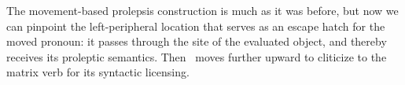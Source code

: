 \documentclass[output=paper,colorlinks,citecolor=brown]{langscibook}
\begin{document}
\ea%
    \label{ex:newkirk:39}
\z

The movement-based prolepsis construction is much as it was before, but now we can pinpoint the left-peripheral location that serves as an escape hatch for the moved pronoun: it passes through the site of the evaluated object, and thereby receives its proleptic semantics. Then \agre\ moves further upward to cliticize to the matrix verb for its syntactic licensing.
\end{document}
